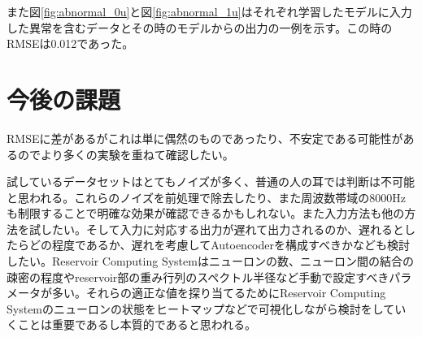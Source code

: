 \documentclass[uplatex,a4paper,10pt]{jsarticle}
\begin{document}
また図\ref{fig:abnormal_0u}と図\ref{fig:abnormal_1u}はそれぞれ学習したモデルに入力した異常を含むデータとその時のモデルからの出力の一例を示す。この時のRMSEは0.012であった。

\section{今後の課題}
RMSEに差があるがこれは単に偶然のものであったり、不安定である可能性があるのでより多くの実験を重ねて確認したい。

試しているデータセットはとてもノイズが多く、普通の人の耳では判断は不可能と思われる。これらのノイズを前処理で除去したり、また周波数帯域の8000Hzも制限することで明確な効果が確認できるかもしれない。また入力方法も他の方法を試したい。そして入力に対応する出力が遅れて出力されるのか、遅れるとしたらどの程度であるか、遅れを考慮してAutoencoderを構成すべきかなども検討したい。Reservoir Computing Systemはニューロンの数、ニューロン間の結合の疎密の程度やreservoir部の重み行列のスペクトル半径など手動で設定すべきパラメータが多い。それらの適正な値を探り当てるためにReservoir Computing Systemのニューロンの状態をヒートマップなどで可視化しながら検討をしていくことは重要であるし本質的であると思われる。
\end{document}
